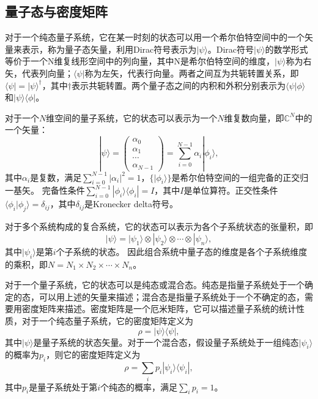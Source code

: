 \subsection{量子态与密度矩阵}

对于一个纯态量子系统，它在某一时刻的状态可以用一个希尔伯特空间中的一个矢量来表示，称为量子态矢量，利用Dirac符号表示为$|\psi\rangle$。Dirac符号$|\psi\rangle$的数学形式等价于一个N维复线形空间中的列向量，其中N是希尔伯特空间的维度，$|\psi\rangle$称为右矢，代表列向量；$\langle\psi|$称为左矢，代表行向量。两者之间互为共轭转置关系，即$\langle\psi| = |\psi\rangle^\dagger$，其中$\dagger$表示共轭转置。两个量子态之间的内积和外积分别表示为$\langle\psi|\phi\rangle$和$|\psi\rangle\langle\phi|$。

对于一个$N$维空间的量子系统，它的状态可以表示为一个$N$维复数向量，即$\mathbb{C}^N$中的一个矢量：
\begin{equation}
    |\psi\rangle = \begin{pmatrix} \alpha_0 \\ \alpha_1 \\ \cdots \\ \alpha_{N-1} \end{pmatrix} = \sum_{i=0}^{N-1} \alpha_i|\phi_i\rangle,
\end{equation}
其中$\alpha_i$是复数，满足$\sum_{i=0}^{N-1} |\alpha_i|^2 = 1$，$\{|\phi_i\rangle\}$是希尔伯特空间的一组完备的正交归一基矢。
完备性条件$\sum_{i=0}^{N-1} |\phi_i\rangle\langle\phi_i| = I$，其中$I$是单位算符。正交性条件$\langle\phi_i|\phi_j\rangle = \delta_{ij}$，其中$\delta_{ij}$是Kronecker delta符号。


对于多个系统构成的复合系统，它的状态可以表示为各个子系统状态的张量积，即
\begin{equation}
    |\psi\rangle = |\psi_1\rangle \otimes |\psi_2\rangle \otimes \cdots \otimes |\psi_n\rangle,
\end{equation}
其中$|\psi_i\rangle$是第$i$个子系统的状态。
因此组合系统中量子态的维度是各个子系统维度的乘积，即$N = N_1 \times N_2 \times \cdots \times N_n$。

对于一个量子系统，它的状态可以是纯态或混合态。纯态是指量子系统处于一个确定的态，可以用上述的矢量来描述；混合态是指量子系统处于一个不确定的态，需要用密度矩阵来描述。密度矩阵是一个厄米矩阵，它可以描述量子系统的统计性质，对于一个纯态量子系统，它的密度矩阵定义为
\begin{equation}
    \rho = |\psi\rangle\langle\psi|,
\end{equation}
其中$|\psi\rangle$是量子系统的状态矢量。对于一个混合态，假设量子系统处于一组纯态$|\psi_i\rangle$的概率为$p_i$，则它的密度矩阵定义为
\begin{equation}
    \rho = \sum_i p_i |\psi_i\rangle\langle\psi_i|,
\end{equation}
其中$p_i$是量子系统处于第$i$个纯态的概率，满足$\sum_i p_i = 1$。


